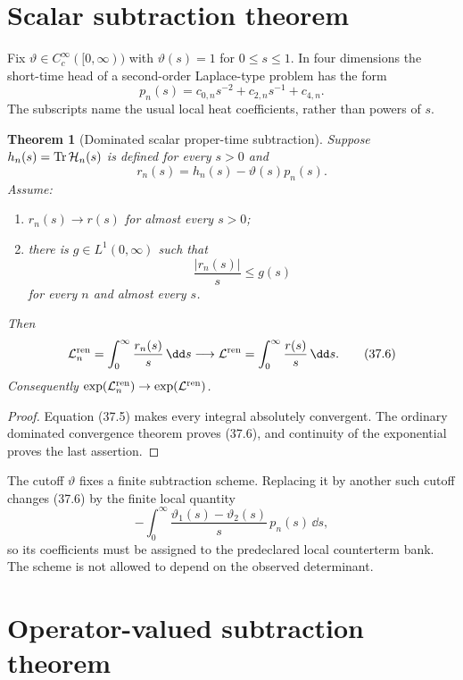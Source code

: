 \documentclass[11pt]{article}
\newtheorem{theorem}{Theorem}[section]
\theoremstyle{remark}
\begin{document}
\section{Scalar subtraction theorem}

Fix \(\vartheta\in C_c^\infty([0,\infty))\) with
\(\vartheta(s)=1\) for \(0\leq s\leq1\).  In four dimensions the
short-time head of a second-order Laplace-type problem has the form
\[
 p_n(s)=c_{0,n}s^{-2}+c_{2,n}s^{-1}+c_{4,n}.             \tag{37.3}
\]
The subscripts name the usual local heat coefficients, rather than
powers of \(s\).

\begin{theorem}[Dominated scalar proper-time subtraction]
\label{thm:v15v37-scalar-heat}
Suppose \(h_n(s)=\operatorname{Tr}{\cal H}_n(s)\) is defined for
every \(s>0\) and
\[
 r_n(s)=h_n(s)-\vartheta(s)p_n(s).                       \tag{37.4}
\]
Assume:
\begin{enumerate}
\item \(r_n(s)\to r(s)\) for almost every \(s>0\);
\item there is \(g\in L^1(0,\infty)\) such that
      \[
       \frac{|r_n(s)|}{s}\leq g(s)                       \tag{37.5}
      \]
      for every \(n\) and almost every \(s\).
\end{enumerate}
Then
\[
 {\cal L}_n^{\rm ren}
 =\int_0^\infty\frac{r_n(s)}s\,\dd s
 \longrightarrow
 {\cal L}^{\rm ren}
 =\int_0^\infty\frac{r(s)}s\,\dd s.                      \tag{37.6}
\]
Consequently
\(\exp({\cal L}_n^{\rm ren})\to
  \exp({\cal L}^{\rm ren})\).
\end{theorem}

\begin{proof}
Equation (37.5) makes every integral absolutely convergent.  The
ordinary dominated convergence theorem proves (37.6), and
continuity of the exponential proves the last assertion.
\end{proof}

The cutoff \(\vartheta\) fixes a finite subtraction scheme.  Replacing
it by another such cutoff changes (37.6) by the finite local
quantity
\[
 -\int_0^\infty
 \frac{\vartheta_1(s)-\vartheta_2(s)}s\,p_n(s)\,\dd s,    \tag{37.7}
\]
so its coefficients must be assigned to the predeclared local
counterterm bank.  The scheme is not allowed to depend on the
observed determinant.

\section{Operator-valued subtraction theorem}
\end{document}
